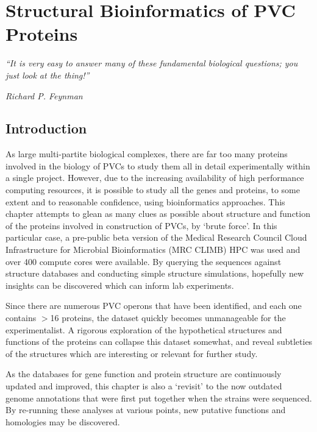 \pagestyle{IHA-fancy-style}


\chapter{Structural Bioinformatics of PVC Proteins}\label{structbioinfo}
\epigraph{\emph{``It is very easy to answer many of these fundamental biological questions; you just look at the thing!''}}{\textit{Richard P. Feynman}}

\section{Introduction}




As large multi-partite biological complexes, there are far too many proteins involved in the biology of PVCs to study them all in detail experimentally within a single project. However, due to the increasing availability of high performance computing resources, it is possible to study all the genes and proteins, to some extent and to reasonable confidence, using bioinformatics approaches. This chapter attempts to glean as many clues as possible about structure and function of the proteins involved in construction of PVCs, by `brute force'. In this particular case, a pre-public beta version of the Medical Research Council Cloud Infrastructure for Microbial Bioinformatics (MRC CLIMB) HPC was used and over 400 compute cores were available. By querying the sequences against structure databases and conducting simple structure simulations, hopefully new insights can be discovered which can inform  lab experiments.

Since there are numerous PVC operons that have been identified, and each one contains $>$16 proteins, the dataset quickly becomes unmanageable for the experimentalist. A rigorous exploration of the hypothetical structures and functions of the proteins can collapse this dataset somewhat, and reveal subtleties of the structures which are interesting or relevant for further study. 

As the databases for gene function and protein structure are continuously updated and improved, this chapter is also a `revisit' to the now outdated genome annotations that were first put together when the strains were sequenced. By re-running these analyses at various points, new putative functions and homologies may be discovered.

